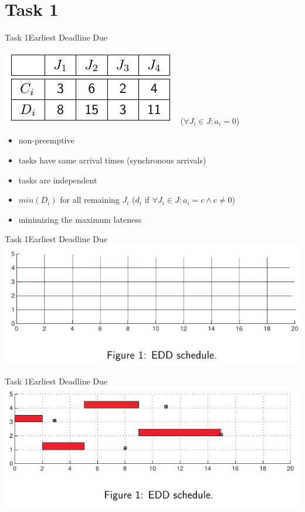 
\section{Task 1}

\setcounter{task}{1}

\begin{frame}{Task 1}{Earliest Deadline Due}
  \vspace{0.5cm}
  \begin{task}
    \centering
    \includegraphics[height=0.2\paperheight]{./figures/1_tab.png}
    ($\forall J_i \in J: a_i = 0$)
  \end{task}
  \begin{requirements}
    \begin{itemize}
      \item \alert{non-preemptive}
      \item tasks have \alert{same arrival times} (synchronous arrivals)
      \item tasks are \alert{independent}
      \item $min(D_i)$ for all remaining $J_i$ ($d_i$ if $\forall J_i\in J: a_i=c \wedge c\ne 0$)
      \item \alert{minimizing} the \alert{maximum lateness}
    \end{itemize}
    \centering
  \end{requirements}
\end{frame}

\begin{frame}{Task 1}{Earliest Deadline Due}
  \includegraphics[width=\textwidth]{./figures/1_empty.png}
\end{frame}

\begin{frame}{Task 1}{Earliest Deadline Due}
  \includegraphics[width=\textwidth]{./figures/1_sol.png}
\end{frame}
